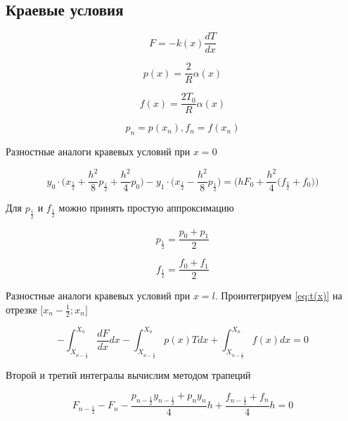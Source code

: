 \subsection{Краевые условия}

\begin{equation*}
    F = -k(x)\frac{dT}{dx}
\end{equation*}

\begin{equation*}
    p(x) = \frac{2}{R} \alpha(x)
\end{equation*}

\begin{equation*}
    f(x) = \frac{2T_0}{R} \alpha(x)
\end{equation*}

\begin{equation*}
    p_n = p(x_n), f_n = f(x_n)
\end{equation*}

Разностные аналоги кравевых условий при $x = 0$

\begin{equation}\label{eq:left}
    y_0 \cdot \bigg( x_{\frac{1}{2}} + \frac{h^2}{8} p_{\frac{1}{2}} +
    \frac{h^2}{4}p_0 \bigg) - y_1 \cdot \bigg( x_{\frac{1}{2}} - \frac{h^2}{8}
    p_{\frac{1}{2}} \bigg) = \bigg( hF_0 + \frac{h^2}{4} \big(f_\frac{1}{2}+
    f_0 \big) \bigg)
\end{equation}

Для $p_\frac{1}{2}$ и $f_\frac{1}{2}$ можно принять простую аппроксимацию

\begin{equation*}
    p_\frac{1}{2} = \frac{p_0 + p_1}{2}
\end{equation*}

\begin{equation*}
    f_\frac{1}{2} = \frac{f_0 + f_1}{2}
\end{equation*}

Разностные аналоги кравевых условий при $x = l$. Проинтегрируем \ref{eq:t(x)} на отрезке $\big[ x_n-\frac{1}{2}; x_n \big]$

\begin{equation*}
    -\int_{X_{n-\frac{1}{2}}}^{X_n} \frac{dF}{dx} dx -
    \int_{X_{n-\frac{1}{2}}}^{X_n} p(x)T dx +
    \int_{X_{n-\frac{1}{2}}}^{X_n} f(x) dx = 0
\end{equation*}

Второй и третий интегралы вычислим методом трапеций

\begin{equation*}
    F_{n-\frac{1}{2}} - F_n -
    \frac{p_{n-\frac{1}{2}}y_{n-\frac{1}{2}} + p_ny_n}{4} h +
    \frac{f_{n-\frac{1}{2}} + f_n}{4} h = 0
\end{equation*}

